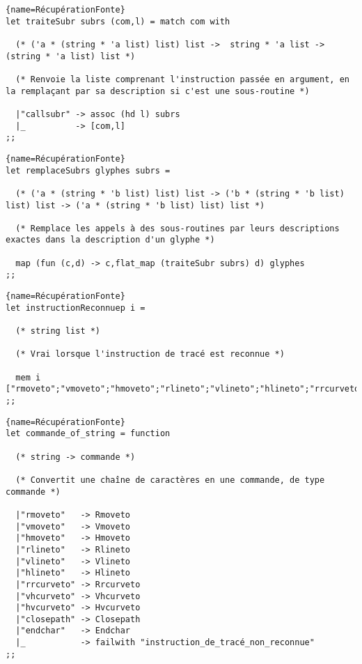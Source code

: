 \documentclass[10pt,twoside,a4paper]{article}
\begin{document}
\begin{lstlisting}{name=RécupérationFonte}
let traiteSubr subrs (com,l) = match com with

  (* ('a * (string * 'a list) list) list ->  string * 'a list -> (string * 'a list) list *)
    
  (* Renvoie la liste comprenant l'instruction passée en argument, en la remplaçant par sa description si c'est une sous-routine *)
    
  |"callsubr" -> assoc (hd l) subrs
  |_          -> [com,l]
;;
\end{lstlisting}
\pagebreak
\begin{lstlisting}{name=RécupérationFonte}
let remplaceSubrs glyphes subrs =

  (* ('a * (string * 'b list) list) list -> ('b * (string * 'b list) list) list -> ('a * (string * 'b list) list) list *)

  (* Remplace les appels à des sous-routines par leurs descriptions exactes dans la description d'un glyphe *)
  
  map (fun (c,d) -> c,flat_map (traiteSubr subrs) d) glyphes
;;
\end{lstlisting}

\begin{lstlisting}{name=RécupérationFonte}
let instructionReconnuep i =

  (* string list *)
  
  (* Vrai lorsque l'instruction de tracé est reconnue *)

  mem i ["rmoveto";"vmoveto";"hmoveto";"rlineto";"vlineto";"hlineto";"rrcurveto";"vhcurveto";"hvcurveto";"closepath";"endchar"]
;;
\end{lstlisting}

\begin{lstlisting}{name=RécupérationFonte}
let commande_of_string = function

  (* string -> commande *)

  (* Convertit une chaîne de caractères en une commande, de type commande *)

  |"rmoveto"   -> Rmoveto
  |"vmoveto"   -> Vmoveto
  |"hmoveto"   -> Hmoveto
  |"rlineto"   -> Rlineto
  |"vlineto"   -> Vlineto
  |"hlineto"   -> Hlineto
  |"rrcurveto" -> Rrcurveto
  |"vhcurveto" -> Vhcurveto
  |"hvcurveto" -> Hvcurveto
  |"closepath" -> Closepath
  |"endchar"   -> Endchar
  |_           -> failwith "instruction_de_tracé_non_reconnue"
;;    
\end{lstlisting}
\end{document}
